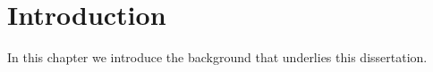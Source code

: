 \chapter{Introduction}

In this chapter we introduce the background that underlies this dissertation.

